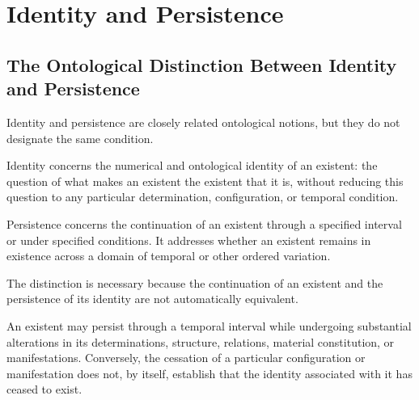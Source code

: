 %
%

\section{Identity and Persistence}
\label{sec:identity-and-persistence}

\subsection{The Ontological Distinction Between Identity and Persistence}

Identity and persistence are closely related ontological
notions, but they do not designate the same condition.

Identity concerns the numerical and ontological identity
of an existent: the question of what makes an existent
the existent that it is, without reducing this question
to any particular determination, configuration, or
temporal condition.

Persistence concerns the continuation of an existent
through a specified interval or under specified conditions.
It addresses whether an existent remains in existence
across a domain of temporal or other ordered variation.

The distinction is necessary because the continuation
of an existent and the persistence of its identity are
not automatically equivalent.

An existent may persist through a temporal interval while
undergoing substantial alterations in its determinations,
structure, relations, material constitution, or
manifestations. Conversely, the cessation of a particular
configuration or manifestation does not, by itself,
establish that the identity associated with it has ceased
to exist.

